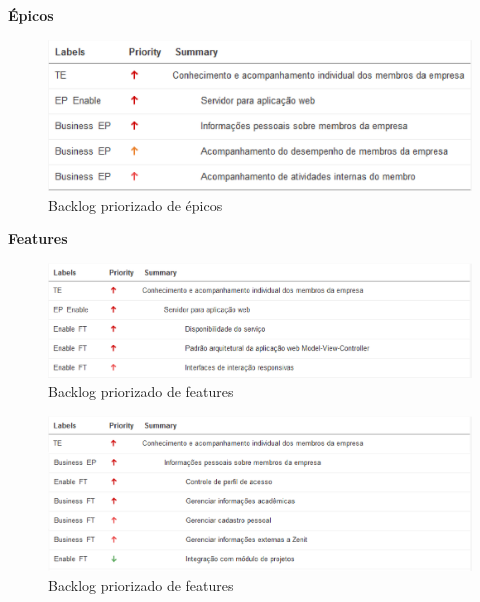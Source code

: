 \textbf{Épicos}

\begin{figure}[H]
    \centering
    \includegraphics[keepaspectratio=true,scale=0.6]{figuras/blep01.eps}
    \caption[Backlog épicos]{Backlog priorizado de épicos\label{blep01}}
\end{figure}

\textbf{Features}

\begin{figure}[H]
    \centering
    \includegraphics[keepaspectratio=true,scale=0.6]{figuras/blft01.eps}
    \caption[Backlog features]{Backlog priorizado de features\label{blft01}}
\end{figure}

\begin{figure}[H]
    \centering
    \includegraphics[keepaspectratio=true,scale=0.6]{figuras/blft02.eps}
    \caption[Backlog features]{Backlog priorizado de features\label{blft02}}
\end{figure}

